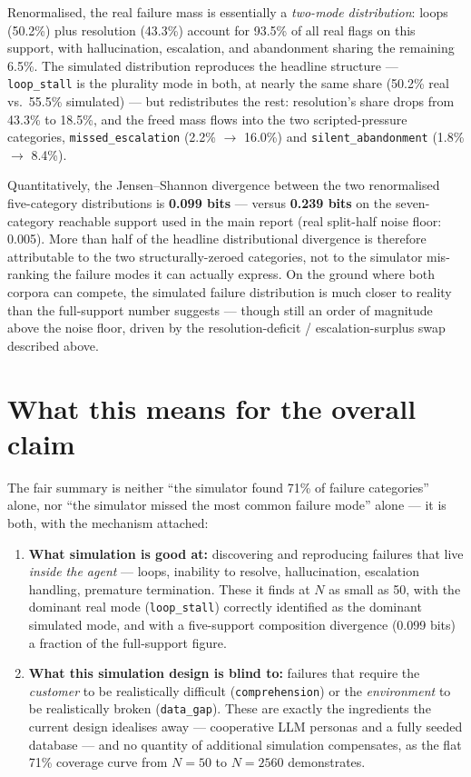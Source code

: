 \documentclass[11pt,a4paper]{article}
\newcommand{\cat}[1]{\texttt{#1}}
\begin{document}
Renormalised, the real failure mass is essentially a \emph{two-mode distribution}: loops (50.2\%)
plus resolution (43.3\%) account for 93.5\% of all real flags on this support, with hallucination,
escalation, and abandonment sharing the remaining 6.5\%. The simulated distribution reproduces the
headline structure --- \cat{loop\_stall} is the plurality mode in both, at nearly the same share
(50.2\% real vs.\ 55.5\% simulated) --- but redistributes the rest: resolution's share drops from
43.3\% to 18.5\%, and the freed mass flows into the two scripted-pressure categories,
\cat{missed\_escalation} (2.2\% $\rightarrow$ 16.0\%) and \cat{silent\_abandonment}
(1.8\% $\rightarrow$ 8.4\%).

Quantitatively, the Jensen--Shannon divergence between the two renormalised five-category
distributions is \textbf{0.099 bits} --- versus \textbf{0.239 bits} on the seven-category
reachable support used in the main report (real split-half noise floor: 0.005). More than half of
the headline distributional divergence is therefore attributable to the two structurally-zeroed
categories, not to the simulator mis-ranking the failure modes it can actually express. On the
ground where both corpora can compete, the simulated failure distribution is much closer to
reality than the full-support number suggests --- though still an order of magnitude above the
noise floor, driven by the resolution-deficit / escalation-surplus swap described above.

\section{What this means for the overall claim}

The fair summary is neither ``the simulator found 71\% of failure categories'' alone, nor ``the
simulator missed the most common failure mode'' alone --- it is both, with the mechanism attached:

\begin{enumerate}[nosep]
  \item \textbf{What simulation is good at:} discovering and reproducing failures that live
        \emph{inside the agent} --- loops, inability to resolve, hallucination, escalation
        handling, premature termination. These it finds at $N$ as small as 50, with the dominant
        real mode (\cat{loop\_stall}) correctly identified as the dominant simulated mode, and
        with a five-support composition divergence (0.099 bits) a fraction of the full-support
        figure.
  \item \textbf{What this simulation design is blind to:} failures that require the
        \emph{customer} to be realistically difficult (\cat{comprehension}) or the
        \emph{environment} to be realistically broken (\cat{data\_gap}). These are exactly the
        ingredients the current design idealises away --- cooperative LLM personas and a fully
        seeded database --- and no quantity of additional simulation compensates, as the flat 71\%
        coverage curve from $N{=}50$ to $N{=}2560$ demonstrates.
\end{enumerate}
\end{document}
